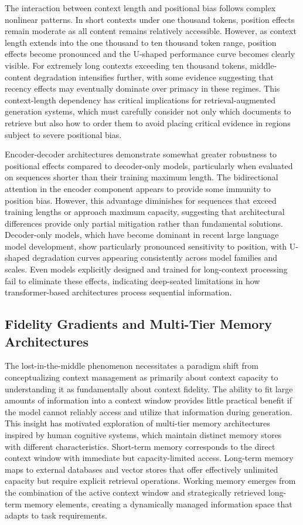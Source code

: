 The interaction between context length and positional bias follows complex nonlinear patterns. In short contexts under one thousand tokens, position effects remain moderate as all content remains relatively accessible. However, as context length extends into the one thousand to ten thousand token range, position effects become pronounced and the U-shaped performance curve becomes clearly visible. For extremely long contexts exceeding ten thousand tokens, middle-content degradation intensifies further, with some evidence suggesting that recency effects may eventually dominate over primacy in these regimes. This context-length dependency has critical implications for retrieval-augmented generation systems, which must carefully consider not only which documents to retrieve but also how to order them to avoid placing critical evidence in regions subject to severe positional bias.

Encoder-decoder architectures demonstrate somewhat greater robustness to positional effects compared to decoder-only models, particularly when evaluated on sequences shorter than their training maximum length. The bidirectional attention in the encoder component appears to provide some immunity to position bias. However, this advantage diminishes for sequences that exceed training lengths or approach maximum capacity, suggesting that architectural differences provide only partial mitigation rather than fundamental solutions. Decoder-only models, which have become dominant in recent large language model development, show particularly pronounced sensitivity to position, with U-shaped degradation curves appearing consistently across model families and scales. Even models explicitly designed and trained for long-context processing fail to eliminate these effects, indicating deep-seated limitations in how transformer-based architectures process sequential information.

\subsection{Fidelity Gradients and Multi-Tier Memory Architectures}

The lost-in-the-middle phenomenon necessitates a paradigm shift from conceptualizing context management as primarily about context capacity to understanding it as fundamentally about context fidelity. The ability to fit large amounts of information into a context window provides little practical benefit if the model cannot reliably access and utilize that information during generation. This insight has motivated exploration of multi-tier memory architectures inspired by human cognitive systems, which maintain distinct memory stores with different characteristics. Short-term memory corresponds to the direct context window with immediate but capacity-limited access. Long-term memory maps to external databases and vector stores that offer effectively unlimited capacity but require explicit retrieval operations. Working memory emerges from the combination of the active context window and strategically retrieved long-term memory elements, creating a dynamically managed information space that adapts to task requirements.

